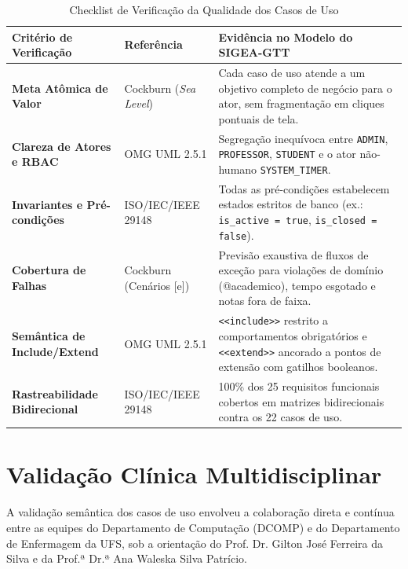 \begin{table}[!ht]
\centering
\caption{Checklist de Verificação da Qualidade dos Casos de Uso}
\label{tab_checklist_qualidade}
\footnotesize
\begin{tabularx}{\textwidth}{p{4.2cm} p{2.2cm} X}
\toprule
\textbf{Critério de Verificação} & \textbf{Referência} & \textbf{Evidência no Modelo do SIGEA-GTT} \\
\midrule
\textbf{Meta Atômica de Valor} & Cockburn (\textit{Sea Level}) & Cada caso de uso atende a um objetivo completo de negócio para o ator, sem fragmentação em cliques pontuais de tela. \\
\textbf{Clareza de Atores e RBAC} & OMG UML 2.5.1 & Segregação inequívoca entre \texttt{ADMIN}, \texttt{PROFESSOR}, \texttt{STUDENT} e o ator não-humano \texttt{SYSTEM\_TIMER}. \\
\textbf{Invariantes e Pré-condições} & ISO/IEC/IEEE 29148 & Todas as pré-condições estabelecem estados estritos de banco (ex.: \texttt{is\_active = true}, \texttt{is\_closed = false}). \\
\textbf{Cobertura de Falhas} & Cockburn (Cenários [e]) & Previsão exaustiva de fluxos de exceção para violações de domínio (@academico), tempo esgotado e notas fora de faixa. \\
\textbf{Semântica de Include/Extend} & OMG UML 2.5.1 & \texttt{<<include>>} restrito a comportamentos obrigatórios e \texttt{<<extend>>} ancorado a pontos de extensão com gatilhos booleanos. \\
\textbf{Rastreabilidade Bidirecional} & ISO/IEC/IEEE 29148 & 100\% dos 25 requisitos funcionais cobertos em matrizes bidirecionais contra os 22 casos de uso. \\
\bottomrule
\end{tabularx}
\end{table}

\section{Validação Clínica Multidisciplinar}
\label{sec_validacao_clinica}

A validação semântica dos casos de uso envolveu a colaboração direta e contínua entre as equipes do Departamento de Computação (DCOMP) e do Departamento de Enfermagem da UFS, sob a orientação do Prof. Dr. Gilton José Ferreira da Silva e da Prof.ª Dr.ª Ana Waleska Silva Patrício.

